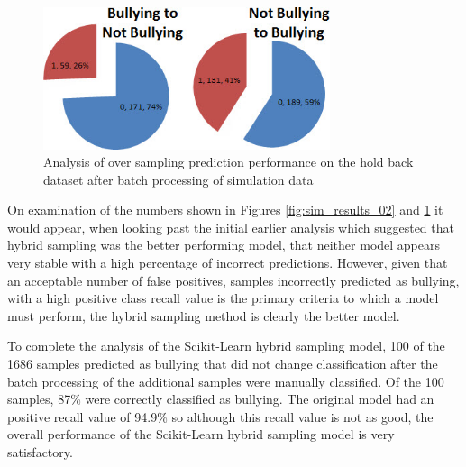 \begin{figure}[htbp]
	\centering
	\includegraphics[width=0.75\textwidth]{Figures/Chapter5/sim_results_03.jpg}
	\caption[Analysis of Over Sampling on Hold Back Dataset]{Analysis of over sampling prediction performance on the hold back dataset after batch processing of simulation data}
	\label{fig:sim_results_03}
\end{figure}

On examination of the numbers shown in Figures \ref{fig:sim_results_02} and \ref{fig:sim_results_03} it would appear, when looking past the initial earlier analysis which suggested that hybrid sampling was the better performing model, that neither model appears very stable with a high percentage of incorrect predictions. However, given that an acceptable number of false positives, samples incorrectly predicted as bullying, with a high positive class recall value is the primary criteria to which a model must perform, the hybrid sampling method is clearly the better model.

To complete the analysis of the Scikit-Learn hybrid sampling model, 100 of the 1686 samples predicted as bullying that did not change classification after the batch processing of the additional samples were manually classified. Of the 100 samples, 87\% were correctly classified as bullying. The original model had an positive recall value of 94.9\% so although this recall value is not as good, the overall performance of the Scikit-Learn hybrid sampling model is very satisfactory.
